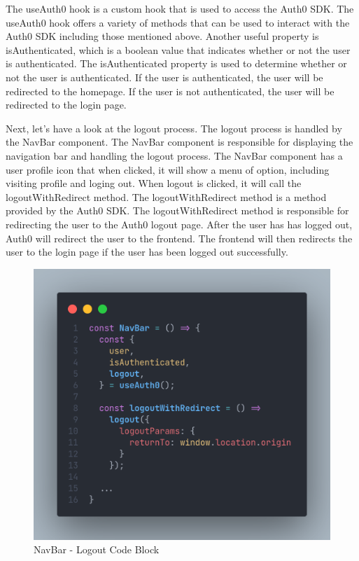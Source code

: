 \begin{justify}
        \vspace{0.25cm}
        \newendline The useAuth0 hook is a custom hook that is used to access the Auth0 SDK. The useAuth0 hook offers a variety of methods that can be used to interact with the Auth0 SDK including those mentioned above. Another useful property is isAuthenticated, which is a boolean value that indicates whether or not the user is authenticated. The isAuthenticated property is used to determine whether or not the user is authenticated. If the user is authenticated, the user will be redirected to the homepage. If the user is not authenticated, the user will be redirected to the login page.
        
        \vspace{0.25cm}
        \newendline Next, let's have a look at the logout process. The logout process is handled by the NavBar component. The NavBar component is responsible for displaying the navigation bar and handling the logout process. The NavBar component has a user profile icon that when clicked, it will show a menu of option, including visiting profile and loging out. When logout is clicked, it will call the logoutWithRedirect method. The logoutWithRedirect method is a method provided by the Auth0 SDK. The logoutWithRedirect method is responsible for redirecting the user to the Auth0 logout page. After the user has has logged out, Auth0 will redirect the user to the frontend. The frontend will then redirects the user to the login page if the user has been logged out successfully.

        \begin{figure}[H]
            \centerline{\includegraphics[width=150mm,scale=1]{figures/implementation_and_testing/implementation/frontend/logout.png}}
            \caption{NavBar - Logout Code Block}
        \end{figure}


\end{justify}
